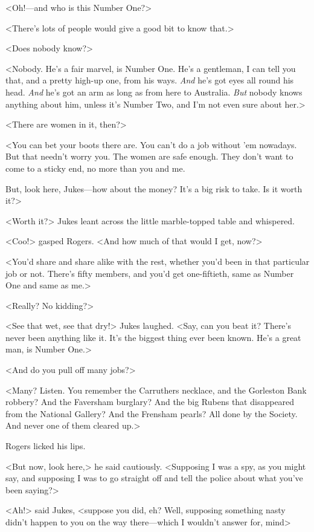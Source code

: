 <Oh!—and who is this Number One?>

<There's lots of people would give a good bit to know that.>

<Does nobody know?>

<Nobody. He's a fair marvel, is Number One. He's a gentleman, I can tell you that, and a pretty high-up one, from his ways. \emph{And} he's got eyes all round his head. \emph{And} he's got an arm as long as from here to Australia. \emph{But} nobody knows anything about him, unless it's Number Two, and I'm not even sure about her.>

<There are women in it, then?>

<You can bet your boots there are. You can't do a job without 'em nowadays. But that needn't worry you. The women are safe enough. They don't want to come to a sticky end, no more than you and me.

But, look here, Jukes—how about the money? It's a big risk to take. Is it worth it?>

<Worth it?> Jukes leant across the little marble-topped table and whispered.

<Coo!> gasped Rogers. <And how much of that would I get, now?>

<You'd share and share alike with the rest, whether you'd been in that particular job or not. There's fifty members, and you'd get one-fiftieth, same as Number One and same as me.>

<Really? No kidding?>

<See that wet, see that dry!> Jukes laughed. <Say, can you beat it? There's never been anything like it. It's the biggest thing ever been known. He's a great man, is Number One.>

<And do you pull off many jobs?>

<Many? Listen. You remember the Carruthers necklace, and the Gorleston Bank robbery? And the Faversham burglary? And the big Rubens that disappeared from the National Gallery? And the Frensham pearls? All done by the Society. And never one of them cleared up.>

Rogers licked his lips.

<But now, look here,> he said cautiously. <Supposing I was a spy, as you might say, and supposing I was to go straight off and tell the police about what you've been saying?>

<Ah!> said Jukes, <suppose you did, eh? Well, supposing something nasty didn't happen to you on the way there—which I wouldn't answer for, mind\longdash>

